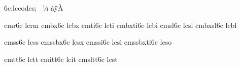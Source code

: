\modifydef 6c:lccodes; {%
   \skipfirststep
   \lccodesloop ^^a0^^bc^^80%
   \lccodesloop ^^e0^^ff^^c0%
   \def\lccodesback {\zerolccodes ^^80^^ff}%
}



\registerECfont    cmr6c       lcrm %
\registerECfont    cmbx6c      lcbx %
\registerECfont    cmti6c      lcti %
\registerECfont    cmbxti6c    lcbi %
\registerECfont    cmsl6c      lcsl %
\registerECfont    cmbxsl6c    lcbl %

\registerECfont    cmss6c      lcss %
\registerECfont    cmssbx6c    lcsx %
\registerECfont    cmssi6c     lcsi %
\registerECfont    cmssbxti6c  lcso %

\registerECTTfont  cmtt6c      lctt %
\registerECTTfont  cmitt6c     lcit %
\registerECTTfont  cmsltt6c    lcst %








